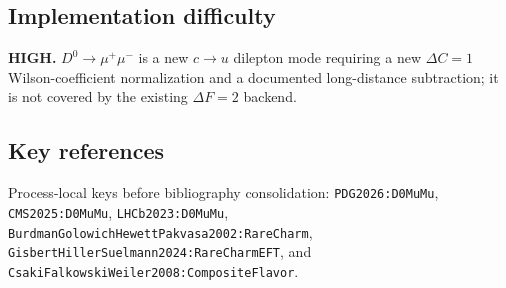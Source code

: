 \subsection*{Implementation difficulty}
\textbf{HIGH.}  \(D^0\to\mu^+\mu^-\) is a new \(c\to u\) dilepton mode
requiring a new \(\Delta C=1\) Wilson-coefficient normalization and a documented
long-distance subtraction; it is not covered by the existing \(\Delta F=2\)
backend.

\subsection*{Key references}
Process-local keys before bibliography consolidation:
\texttt{PDG2026:D0MuMu}, \texttt{CMS2025:D0MuMu},
\texttt{LHCb2023:D0MuMu},
\texttt{BurdmanGolowichHewettPakvasa2002:RareCharm},
\texttt{GisbertHillerSuelmann2024:RareCharmEFT}, and
\texttt{CsakiFalkowskiWeiler2008:CompositeFlavor}.
